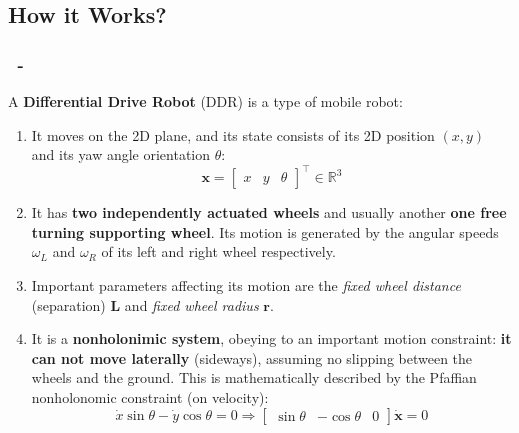 \documentclass{beamer}
\begin{document}
\subsection{How it Works?}
\begin{frame}
    \frametitle{\insertsection \ - \insertsubsection}
    A \textbf{Differential Drive Robot} (DDR) is a type of mobile robot:
    \begin{enumerate}
        \item It moves on the 2D plane, and its state consists of its 2D position $(x, y)$ and its yaw angle orientation $\theta$:
              \[
                  \mathbf{x} = \begin{bmatrix} x & y & \theta \end{bmatrix}^\top \in \mathbb{R}^{3}
              \]
        \item It has \textbf{two independently actuated wheels} and usually another \textbf{one free turning supporting wheel}. Its motion is generated by the angular speeds $\omega_{L}$ and $\omega_{R}$ of its left and right wheel respectively.
        \item Important parameters affecting its motion are the \textit{fixed wheel distance} (separation) $\mathbf{L}$ and \textit{fixed wheel radius} $\mathbf{r}$.
        \item It is a \textbf{nonholonimic system}, obeying to an important motion constraint: \textbf{it can not move laterally} (sideways), assuming no slipping between the wheels and the ground. This is mathematically described by the Pfaffian nonholonomic constraint (on velocity):
              \[
                  \dot{x}\sin\theta - \dot{y}\cos\theta = 0 \Rightarrow
                  \begin{bmatrix} \sin\theta & -\cos\theta & 0 \end{bmatrix} \dot{\mathbf{x}} = 0
              \]
    \end{enumerate}
\end{frame}
\end{document}

